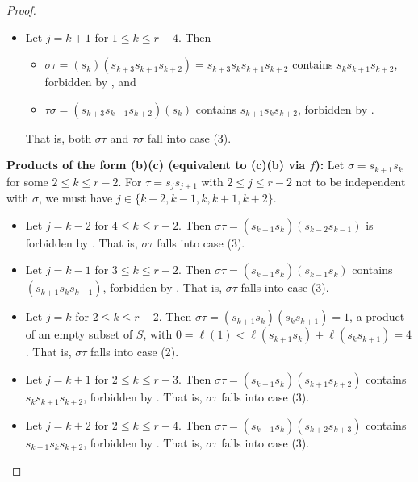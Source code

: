 \documentclass{amsart}
\theoremstyle{definition}
\begin{document}
\begin{appendices}
\begin{proof}
\begin{itemize}
\begin{itemize}
        \end{itemize}
        That is, $\sigma\tau$ falls into case (1) and $\tau\sigma$ falls into case (3).
        \item Let $j=k+1$ for $1\leq k\leq r-4$. Then \begin{itemize}
            \item $\sigma\tau= (s_{k})(s_{k+3}s_{k+1}s_{k+2})=s_{k+3}s_ks_{k+1}s_{k+2}$ contains $s_ks_{k+1}s_{k+2}$, forbidden by , and
            \item $\tau\sigma= (s_{k+3}s_{k+1}s_{k+2})(s_{k})$ contains $s_{k+1}s_ks_{k+2}$, forbidden by .
        \end{itemize}
        That is, both $\sigma\tau$ and $\tau\sigma$ fall into case (3).
    \end{itemize}
\smallskip

\noindent \textbf{Products of the form (b)(c) (equivalent to (c)(b) via $f$):}
    Let $\sigma=s_{k+1}s_k$ for some $2\leq k\leq r-2$. For $\tau=s_js_{j+1}$ with $2\leq j\leq r-2$ not to be independent with $\sigma$, we must have $j\in\{k-2,k-1,k,k+1,k+2\}$.
    \begin{itemize}
        \item Let $j=k-2$ for $4\leq k\leq r-2$. Then $\sigma\tau= (s_{k+1}s_k)(s_{k-2}s_{k-1})$ is forbidden by . That is, $\sigma\tau$ falls into case (3).
        \item Let $j=k-1$ for $3\leq k\leq r-2$. Then $\sigma\tau= (s_{k+1}s_k)(s_{k-1}s_{k})$ contains $(s_{k+1}s_ks_{k-1})$, forbidden by . That is, $\sigma\tau$ falls into case (3).
        \item Let $j=k$ for $2\leq k\leq r-2$. Then $\sigma\tau= (s_{k+1}s_k)(s_{k}s_{k+1})=1$, a product of an empty subset of $S$, {with $0=\ell(1)<\ell(s_{k+1}s_k)+\ell(s_{k}s_{k+1})=4$.} That is, $\sigma\tau$ falls into case (2).
        \item Let $j=k+1$ for $2\leq k\leq r-3$. Then $\sigma\tau= (s_{k+1}s_k)(s_{k+1}s_{k+2}) $ contains $s_ks_{k+1}s_{k+2}$, forbidden by . That is, $\sigma\tau$ falls into case (3).
        \item Let $j=k+2$ for $2\leq k\leq r-4$. Then $\sigma\tau= (s_{k+1}s_k)(s_{k+2}s_{k+3})$ contains $s_{k+1}s_ks_{k+2}$, forbidden by . That is, $\sigma\tau$ falls into case (3).
    \end{itemize}
    
\smallskip


\end{proof}
\end{appendices}
\end{document}
